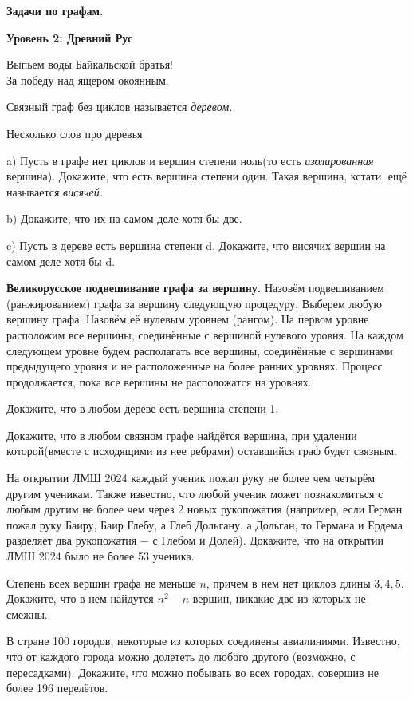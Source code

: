 \hspace{3mm}

\centerline{\bf \Huge  Задачи по графам.}
\centerline{\bf \Huge Уровень 2: Древний Рус}

\begin{flushright}
    \scriptsize{Выпьем воды Байкальской братья!\\ За победу над ящером окоянным.}
\end{flushright}

Связный граф без циклов называется \textit{деревом.}

 Несколько слов про деревья

\noindent a) Пусть в графе нет циклов и вершин степени ноль(то есть \textit{изолированная} вершина). Докажите, что есть вершина степени один. Такая вершина, кстати, ещё называется \textit{висячей.}

 \noindent b) Докажите, что их на самом деле хотя бы две.

 \noindent c) Пусть в дереве есть вершина степени d. Докажите, что висячих вершин на самом деле хотя бы d.

\textbf{Великорусское подвешивание графа за вершину.} Назовём подвешиванием (ранжированием) графа за вершину следующую процедуру. Выберем любую вершину графа. Назовём её нулевым уровнем (рангом). На первом уровне расположим все вершины, соединённые с вершиной нулевого уровня. На каждом следующем уровне будем располагать все вершины, соединённые с вершинами предыдущего уровня и не расположенные на более ранних уровнях. Процесс продолжается, пока все вершины не расположатся на уровнях.

 Докажите, что в любом дереве есть вершина степени 1.

 Докажите, что в любом связном графе найдётся вершина, при удалении которой(вместе с исходящими из нее ребрами) оставшийся граф будет связным.

 На открытии ЛМШ 2024 каждый ученик пожал руку не более чем четырём другим ученикам. Также известно, что любой ученик может познакомиться с любым другим не более чем через 2 новых рукопожатия (например, если Герман пожал руку Баиру, Баир Глебу, а Глеб Дольгану, а Дольган, то Германа и Ердема разделяет два рукопожатия $-$ с Глебом и Долей). Докажите, что на открытии ЛМШ 2024 было не более 53 ученика.

 Степень всех вершин графа не меньше $n$, причем в нем нет циклов длины $3, 4, 5$. Докажите, что в нем найдутся $n^2 - n$ вершин, никакие две из которых не смежны.

 В стране 100 городов, некоторые из которых соединены авиалиниями. Известно, что от каждого города можно долететь до любого другого (возможно, с пересадками). Докажите, что можно побывать во всех городах, совершив не более 196 перелётов.